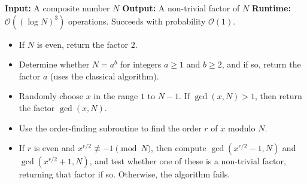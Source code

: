 \begin{algorithm}
    \caption{Shor's Algorithm}
    \begin{algorithmic}[1]
    \State \textbf{Input:} A composite number $N$
    \State \textbf{Output:} A non-trivial factor of $N$
    \State \textbf{Runtime:} $\mathcal{O}((\log N)^3)$ operations. Succeeds with probability $\mathcal{O}(1)$.
    \State \begin{itemize}
        \item If $N$ is even, return the factor $2$.
        \item Determine whether $N = a^b$ for integers $a \geq 1$ and $b \geq 2$, and if so, return the factor $a$ (uses the classical algorithm).
        \item Randomly choose $x$ in the range $1$ to $N - 1$. If $\gcd(x, N) > 1$, then return the factor $\gcd(x, N)$.
        \item Use the order-finding subroutine to find the order $r$ of $x$ modulo $N$.
        \item If $r$ is even and $x^{r/2} \not\equiv -1 \pmod{N}$, then compute $\gcd(x^{r/2} - 1, N)$ and $\gcd(x^{r/2} + 1, N)$, and test whether one of these is a non-trivial factor, returning that factor if so. Otherwise, the algorithm fails.
    \end{itemize}
    \end{algorithmic}
\end{algorithm}









